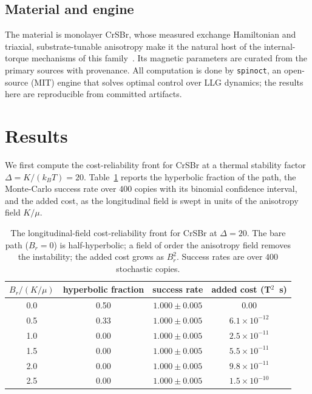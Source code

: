 \documentclass[11pt]{article}
\begin{document}
\subsection{Material and engine}

The material is monolayer CrSBr, whose measured exchange Hamiltonian and triaxial, substrate-tunable
anisotropy make it the natural host of the internal-torque mechanisms of this
family~\citep{scheie2022,rudenko2023}. Its magnetic parameters are curated from the primary sources
with provenance. All computation is done by \texttt{spinoct}, an open-source (MIT) engine that solves
optimal control over LLG dynamics; the results here are reproducible from committed artifacts.

\section{Results}
\label{sec:results}

We first compute the cost-reliability front for CrSBr at a thermal stability factor
$\Delta = K/(k_B T) = 20$. Table~\ref{tab:front} reports the hyperbolic fraction of the path, the Monte-Carlo success
rate over $400$ copies with its binomial confidence interval, and the added cost, as the longitudinal
field is swept in units of the anisotropy field $K/\mu$.

\begin{table}[h]
\centering
\caption{The longitudinal-field cost-reliability front for CrSBr at $\Delta = 20$. The bare path
($B_r = 0$) is half-hyperbolic; a field of order the anisotropy field removes the instability; the
added cost grows as $B_r^2$. Success rates are over $400$ stochastic copies.}
\label{tab:front}
\begin{tabular}{cccc}
\toprule
$B_r/(K/\mu)$ & hyperbolic fraction & success rate & added cost (T$^2$~s) \\
\midrule
0.0 & 0.50 & $1.000 \pm 0.005$ & $0.00$ \\
0.5 & 0.33 & $1.000 \pm 0.005$ & $6.1\times10^{-12}$ \\
1.0 & 0.00 & $1.000 \pm 0.005$ & $2.5\times10^{-11}$ \\
1.5 & 0.00 & $1.000 \pm 0.005$ & $5.5\times10^{-11}$ \\
2.0 & 0.00 & $1.000 \pm 0.005$ & $9.8\times10^{-11}$ \\
2.5 & 0.00 & $1.000 \pm 0.005$ & $1.5\times10^{-10}$ \\
\bottomrule
\end{tabular}
\end{table}
\end{document}

